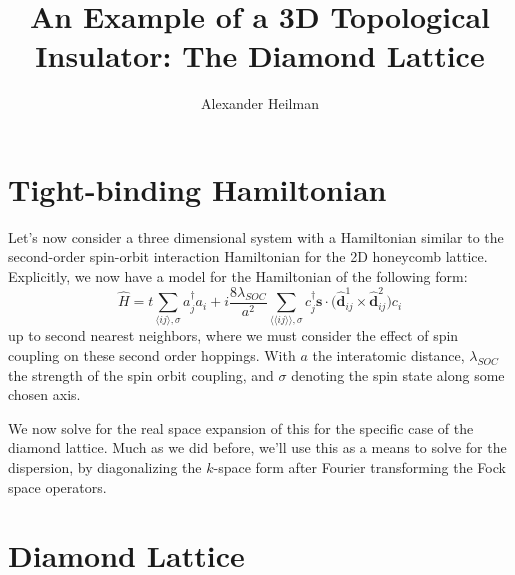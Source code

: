\documentclass[10pt,a4paper]{article}
\title{An Example of a 3D Topological Insulator: The Diamond Lattice}
\author{Alexander Heilman}
\begin{document}
\vspace{-3cm}
 
\maketitle

\begin{multicols}{2}

\section*{Tight-binding Hamiltonian}
Let's now consider a three dimensional system with a Hamiltonian similar to the second-order spin-orbit interaction Hamiltonian for the 2D honeycomb lattice. 
Explicitly, we now have a model for the Hamiltonian of the following form:
$$
\hat{H} = t \sum_{\langle ij\rangle ,\sigma}a^{\dagger}_{j}a_i +i\frac{8\lambda_{SOC}}{a^2}\sum_{\langle\langle ij\rangle\rangle,\sigma}c_j^{\dagger}\mathbf{s}\cdot\big( \mathbf{\hat{d}}^1_{ij}\times \mathbf{\hat{d}}^2_{ij}\big)c_i
$$
up to second nearest neighbors, where we must consider the effect of spin coupling on these second order hoppings. With $a$ the interatomic distance,
$\lambda_{SOC}$ the strength of the spin orbit coupling, and $\sigma$ denoting the spin state along some chosen axis.


We now solve for the real space expansion of this for the specific case of the diamond lattice. Much as we did before, we'll use this as a means to solve for the dispersion, by diagonalizing the $k$-space form after Fourier transforming the Fock space operators.
\section{Diamond Lattice}


\end{multicols}
\end{document}
